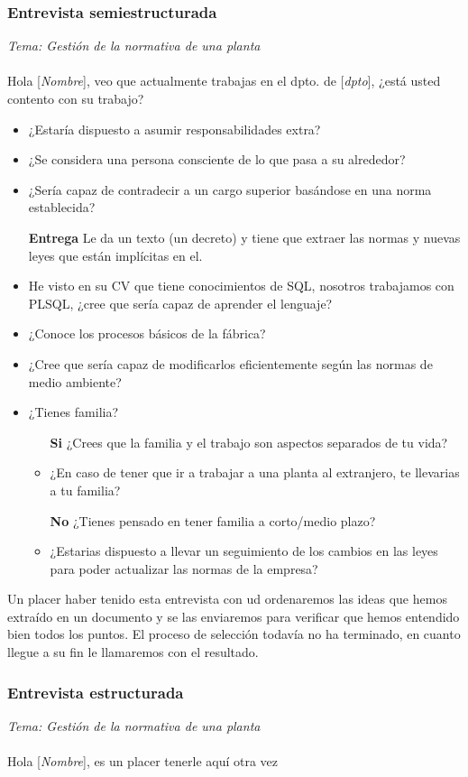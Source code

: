 \documentclass[a4paper]{article}
\begin{document}
\subsubsection{Entrevista semiestructurada}
\textit{Tema: Gestión de la normativa de una planta}\\\\
Hola [\textit{Nombre}], veo que actualmente trabajas en el dpto. de [\textit{dpto}], ¿está usted contento con su trabajo?

\begin{itemize}
	\item ¿Estaría dispuesto a asumir responsabilidades extra?
	\item ¿Se considera una persona consciente de lo que pasa a su alrededor?
	\item ¿Sería capaz de contradecir a un cargo superior basándose en una norma establecida?
	\item[\textbf{Entrega}] Le da un texto (un decreto) y tiene que extraer las normas y nuevas leyes que están implícitas en el.
	\item He visto en su CV que tiene conocimientos de SQL, nosotros trabajamos con PLSQL, ¿cree que sería capaz de aprender el lenguaje?
	\item ¿Conoce los procesos básicos de la fábrica?
	\item ¿Cree que sería capaz de modificarlos eficientemente según las normas de medio ambiente?
	\item ¿Tienes familia?
	\begin{itemize}		
	\item[\textbf{Si}] ¿Crees que la familia y el trabajo son aspectos separados de tu vida?
	\item ¿En caso de tener que ir a trabajar a una planta al extranjero, te llevarias a tu familia?
	\item[\textbf{No}] ¿Tienes pensado en tener familia a corto/medio plazo?
	\item ¿Estarias dispuesto a llevar un seguimiento de los cambios en las leyes para poder actualizar las normas de la empresa?
	\end{itemize}
\end{itemize}
Un placer haber tenido esta entrevista con ud ordenaremos las ideas que hemos extraído en un documento y se las enviaremos para verificar que hemos entendido bien todos los puntos. El proceso de selección todavía no ha terminado, en cuanto llegue a su fin le llamaremos con el resultado.

\subsubsection{Entrevista estructurada}
\textit{Tema: Gestión de la normativa de una planta}\\\\
Hola [\textit{Nombre}], es un placer tenerle aquí otra vez
\end{document}
